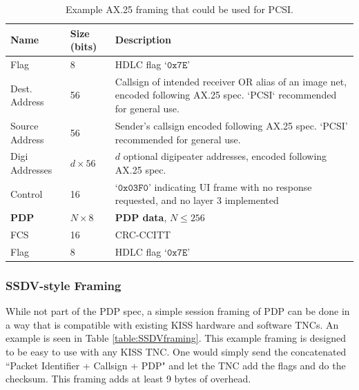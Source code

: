 \documentclass[letterpaper]{article}
\begin{document}
\begin{table}[tbp]
    \centering
\begin{tabularx}{\textwidth}{ |l|l|X| } 
 \hline
 \textbf{Name} & \textbf{Size (bits)} & \textbf{Description} \\ \hline\hline
 Flag & 8 & HDLC flag `$\mathtt{0x7E}$' \\ \hline
 Dest. Address & 56 & Callsign of intended receiver OR alias of an image net, encoded following AX.25 spec. `PCSI` recommended for general use. \\ \hline
 Source Address & 56 & Sender's callsign encoded following AX.25 spec. `PCSI' recommended for general use. \\ \hline
 Digi Addresses & $d\times56$ & $d$ optional digipeater addresses, encoded following AX.25 spec. \\ \hline
 Control & 16 & `$\mathtt{0x03F0}$' indicating UI frame with no response requested, and no layer 3 implemented  \\ \hline
 \textbf{PDP} & $N\times 8$ & \textbf{PDP data}, $N\leq 256$ \\ \hline
 FCS & 16 & CRC-CCITT\\ \hline
 Flag & 8 & HDLC flag `$\mathtt{0x7E}$' \\
 \hline
\end{tabularx}
\caption{Example AX.25 framing that could be used for PCSI.}
\label{table:AX.25framing}
\end{table}

\subsubsection{SSDV-style Framing}\label{section:SSDVframing}
While not part of the PDP spec, a simple session framing of PDP can be done in a way that is compatible with existing KISS hardware and software TNCs. An example is seen in Table \ref{table:SSDVframing}. This example framing is designed to be easy to use with any KISS TNC. One would simply send the concatenated ``Packet Identifier + Callsign + PDP" and let the TNC add the flags and do the checksum. This framing adds at least 9 bytes of overhead. 
\end{document}
